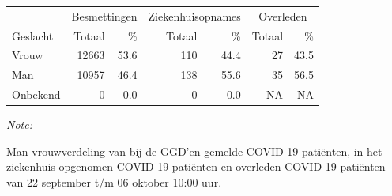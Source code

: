 \documentclass[
  english,
  man,floatsintext]{apa6}
\begin{document}
\begin{table}
\centering\begingroup\fontsize{11}{13}\selectfont

\begin{threeparttable}
\begin{tabular}{lrrrrrr}
\toprule
\multicolumn{1}{c}{ } & \multicolumn{2}{c}{Besmettingen} & \multicolumn{2}{c}{Ziekenhuisopnames} & \multicolumn{2}{c}{Overleden} \\
\cmidrule(l{3pt}r{3pt}){2-3} \cmidrule(l{3pt}r{3pt}){4-5} \cmidrule(l{3pt}r{3pt}){6-7}
Geslacht & Totaal & \% & Totaal & \% & Totaal & \%\\
\midrule
Vrouw & 12663 & 53.6 & 110 & 44.4 & 27 & 43.5\\
Man & 10957 & 46.4 & 138 & 55.6 & 35 & 56.5\\
Onbekend & 0 & 0.0 & 0 & 0.0 & NA & NA\\
\bottomrule
\end{tabular}
\begin{tablenotes}
\item \textit{Note: } 
\item Man-vrouwverdeling van bij de GGD’en gemelde COVID-19 patiënten, in het ziekenhuis opgenomen COVID-19 patiënten en overleden COVID-19 patiënten van 22 september t/m 06 oktober 10:00 uur.
\end{tablenotes}
\end{threeparttable}
\endgroup{}
\end{table}
\newpage
\end{document}
